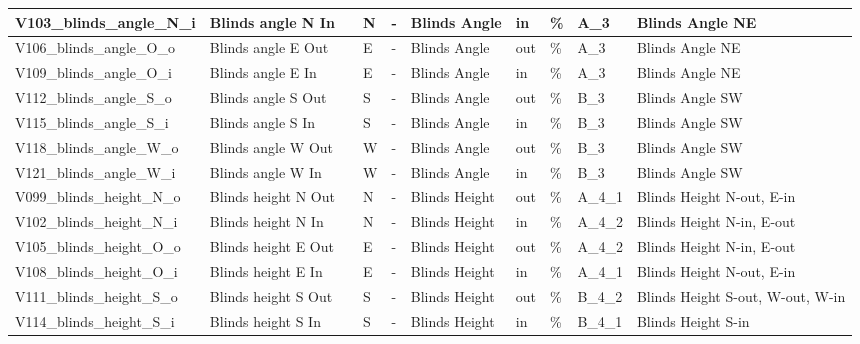 \begin{landscape}
\begin{table}[htbp]
\begin{tabular}{|l|l|r|l|l|l|l|l|l|l|}
    \hline
    V103\_blinds\_angle\_N\_i & Blinds angle N In &      & N    & -    & Blinds Angle & in   & \%   & A\_3 & Blinds Angle NE \bigstrut\\
    \hline
    \rowcolor[rgb]{ .851,  .851,  .851} V106\_blinds\_angle\_O\_o & Blinds angle E Out &      & E    & -    & Blinds Angle & out  & \%   & A\_3 & Blinds Angle NE \bigstrut\\
    \hline
    V109\_blinds\_angle\_O\_i & Blinds angle E In &      & E    & -    & Blinds Angle & in   & \%   & A\_3 & Blinds Angle NE \bigstrut\\
    \hline
    \rowcolor[rgb]{ .851,  .851,  .851} V112\_blinds\_angle\_S\_o & Blinds angle S Out &      & S    & -    & Blinds Angle & out  & \%   & B\_3 & Blinds Angle SW \bigstrut\\
    \hline
    V115\_blinds\_angle\_S\_i & Blinds angle S In &      & S    & -    & Blinds Angle & in   & \%   & B\_3 & Blinds Angle SW \bigstrut\\
    \hline
    \rowcolor[rgb]{ .851,  .851,  .851} V118\_blinds\_angle\_W\_o & Blinds angle W Out &      & W    & -    & Blinds Angle & out  & \%   & B\_3 & Blinds Angle SW \bigstrut\\
    \hline
    V121\_blinds\_angle\_W\_i & Blinds angle W In &      & W    & -    & Blinds Angle & in   & \%   & B\_3 & Blinds Angle SW \bigstrut\\
    \hline
    \rowcolor[rgb]{ .851,  .851,  .851} V099\_blinds\_height\_N\_o & Blinds height N Out &      & N    & -    & Blinds Height & out  & \%   & A\_4\_1 & Blinds Height N-out, E-in \bigstrut\\
    \hline
    V102\_blinds\_height\_N\_i & Blinds height N In &      & N    & -    & Blinds Height & in   & \%   & A\_4\_2 & Blinds Height N-in, E-out \bigstrut\\
    \hline
    \rowcolor[rgb]{ .851,  .851,  .851} V105\_blinds\_height\_O\_o & Blinds height E Out &      & E    & -    & Blinds Height & out  & \%   & A\_4\_2 & Blinds Height N-in, E-out \bigstrut\\
    \hline
    V108\_blinds\_height\_O\_i & Blinds height E In &      & E    & -    & Blinds Height & in   & \%   & A\_4\_1 & Blinds Height N-out, E-in \bigstrut\\
    \hline
    \rowcolor[rgb]{ .851,  .851,  .851} V111\_blinds\_height\_S\_o & Blinds height S Out &      & S    & -    & Blinds Height & out  & \%   & B\_4\_2 & Blinds Height S-out, W-out, W-in \bigstrut\\
    \hline
    V114\_blinds\_height\_S\_i & Blinds height S In &      & S    & -    & Blinds Height & in   & \%   & B\_4\_1 & Blinds Height S-in \bigstrut\\

\end{tabular}
\end{table}
\end{landscape}
